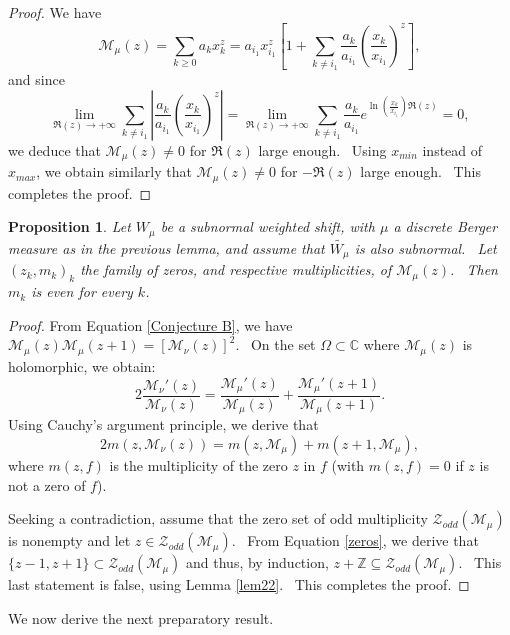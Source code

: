 \documentclass[12pt]{amsart}
\newtheorem{prop}[thm]{Proposition}
\begin{document}
\begin{proof} We have 
$$\mathcal{M}_\mu(z)=\sum_{k\ge 0}  a_kx_k^z =a_{i_1}x_{i_1}^z\left[1+ \sum_{k\ne i_1}  \frac{a_k}{a_{i_1}}(\frac{x_k}{x_{i_1}})^z \right], $$ 
and since $$\lim\limits_{\Re(z)\to +\infty}\sum\limits_{k\ne i_1}| \frac{a_k}{a_{i_1}}(\frac{x_k}{x_{i_1}})^z| = \lim\limits_{\Re(z)\to +\infty}\sum\limits_{k\ne i_1}  \frac{a_k}{a_{i_1}}e^{\ln(\frac{x_k}{x_{i_1}})\Re(z)}=0, $$
we deduce that $\mathcal{M}_\mu(z)\ne 0$ for $\Re(z)$ large enough. \ Using $x_{min}$ instead of $x_{max}$, we obtain  similarly that $\mathcal{M}_\mu(z)\ne 0$ for $-\Re(z)$  large enough. \ This completes the proof.
\end{proof}

\begin{prop}\label{lem21} Let $W_\mu$ be a subnormal weighted shift, with $\mu$ a discrete Berger measure as in the previous lemma, and assume that $\widetilde{ W_\mu}$ is also subnormal. \ Let $(z_k,m_k)_k$ the family of zeros, and respective multiplicities, of 
    $\mathcal{M}_{\mu}(z)$. \ Then $m_k$ is even for every $k$. 
\end{prop}

\begin{proof}
    From Equation \eqref{Conjecture B}, we have $\mathcal{M}_{\mu}(z)\mathcal{M}_{\mu}(z+1)=[\mathcal{M}_{\nu}(z)]^2$. \ On the set $\Omega\subset\mathbb{C}$ where $\mathcal{M}_{\mu}(z)$ is holomorphic, we obtain:
 $$    2\frac{\mathcal{M}_{\nu}'(z)}{\mathcal{M}_{\nu}(z)}=\frac{\mathcal{M}_{\mu}'(z)}{\mathcal{M}_{\mu}(z)}+\frac{\mathcal{M}_{\mu}'(z+1)}{\mathcal{M}_{\mu}(z+1)}.
 $$
Using Cauchy's argument principle, we derive that
\begin{equation}\label{zeros}
2 m(z,\mathcal{M}_{\nu}(z))=m(z,\mathcal{M}_{\mu})+m(z+1,\mathcal{M}_{\mu}),
\end{equation}
where $m(z,f)$ is the  multiplicity of the zero $z$ in $f$ (with $m(z,f)=0$ if $z$ is not a zero of $f$).

Seeking a contradiction, assume that the zero set of odd multiplicity  $ \mathcal{Z}_{odd}(\mathcal{M}_\mu)$ is nonempty and let $z\in \mathcal{Z}_{odd}(\mathcal{M}_\mu)$. \ From Equation \eqref{zeros}, we derive that $\{z-1, z+1\}\subset \mathcal{Z}_{odd}(\mathcal{M}_\mu)$ and thus, by induction, $z+\mathbb{Z}\subseteq \mathcal{Z}_{odd}(\mathcal{M}_\mu)$. \ This last statement is false, using Lemma \ref{lem22}. \ This completes the proof.
\end{proof}

We now derive the next preparatory result.
\end{document}
